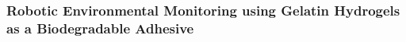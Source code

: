 \subsubsection{Robotic Environmental Monitoring using Gelatin Hydrogels as a Biodegradable Adhesive}


